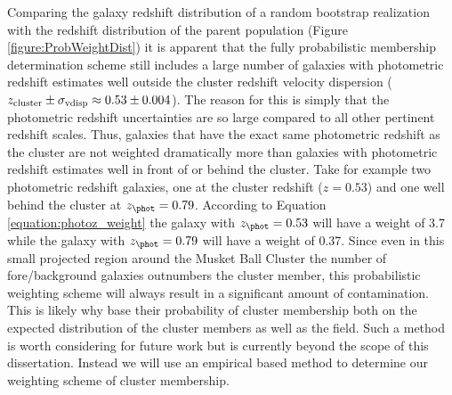 Comparing the galaxy redshift distribution of a random bootstrap realization with the redshift distribution of the parent population (Figure \ref{figure:ProbWeightDist}) it is apparent that the fully probabilistic membership determination scheme still includes a large number of galaxies with photometric redshift estimates well outside the cluster redshift velocity dispersion ($z_{\rm cluster}\pm\sigma_{\rm vdisp} \approx 0.53\pm0.004$).
The reason for this is simply that the photometric redshift uncertainties are so large compared to all other pertinent redshift scales.
Thus, galaxies that have the exact same photometric redshift as the cluster are not weighted dramatically more than galaxies with photometric redshift estimates well in front of or behind the cluster.
Take for example two photometric redshift galaxies, one at the cluster redshift ($z=0.53$) and one well behind the cluster at $z_{\phot}=0.79$.
According to Equation \ref{equation:photoz_weight} the galaxy with $z_{\phot}=0.53$ will have a weight of 3.7 while the galaxy with $z_{\phot}=0.79$ will have a weight of 0.37.
Since even in this small projected region around the Musket Ball Cluster the number of fore/background galaxies outnumbers the cluster member, this probabilistic weighting scheme will always result in a significant amount of contamination.
This is likely why \citet{George:2011kv} base their probability of cluster membership both on the expected distribution of the cluster members as well as the field.
Such a method is worth considering for future work but is currently beyond the scope of this dissertation.
Instead we will use an empirical based method to determine our weighting scheme of cluster membership. 


